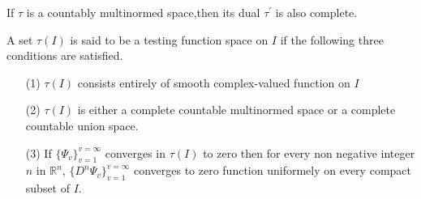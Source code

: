 \begin{large}
\begin{lemma}
\begin{theorem}
If $ \tau $ is a countably multinormed space,then its dual $ \tau^{'} $ is also complete.
\end{theorem}

\begin{definition}

A set $ \tau(I) $ is said to be a testing function space on $ I $ if the following three conditions are satisfied.
\begin{enumerate}
\item[(1)] $ \tau(I) $ consists entirely of smooth complex-valued function on $ I $ 
\item[(2)] $ \tau(I) $  is either a complete countable multinormed space or a complete countable union space.
\item[(3)] If $\lbrace \Psi_{v}\rbrace_{v=1}^{v=\infty}$ converges in $ \tau(I) $ to zero then for every non negative integer $ n $ in $ \mathbb{R}^{n} $, $\lbrace D^{n}\Psi_{v}\rbrace_{v=1}^{v=\infty}$ converges to zero function uniformely on every compact subset of $ I $.
\end{enumerate}
\end{definition}
\end{lemma}


\end{large}
